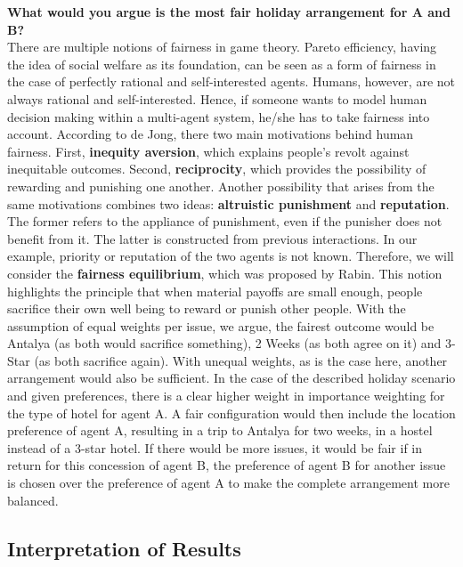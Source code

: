 \documentclass[a4paper,11pt]{article}
\theoremstyle{mytheor}
\begin{document}
\textbf{What would you argue is the most fair holiday arrangement for A and B?}\\
 There are multiple notions of fairness in game theory. Pareto efficiency, having the idea of social welfare as its foundation, can be seen as a form of fairness in the case of perfectly rational and self-interested agents. Humans, however, are not always rational and self-interested. Hence, if someone wants to model human decision making within a multi-agent system, he/she has to take fairness into account.\cite{Jong_Tuyls_Verbeeck_Roos}
According to de Jong, there two main motivations behind human fairness. First, \textbf{inequity aversion}, which explains people's revolt against inequitable outcomes. Second, \textbf{reciprocity}, which provides the possibility of rewarding and punishing one another. %
Another possibility that arises from the same motivations combines two ideas: \textbf{altruistic punishment} and \textbf{reputation}. The former refers to the appliance of punishment, even if the punisher does not benefit from it. The latter is constructed from previous interactions.\cite{Jong_Tuyls_Verbeeck_2008}
In our example, priority or reputation of the two agents is not known. Therefore, we will consider the \textbf{fairness equilibrium}, which was proposed by Rabin.\cite{Rabin_1993} This notion highlights the principle that when material payoffs are small enough, people sacrifice their own well being to reward or punish other people. With the assumption of equal weights per issue, we argue, the fairest outcome would be Antalya (as both would sacrifice something), 2 Weeks (as both agree on it) and 3-Star (as both sacrifice again). With unequal weights, as is the case here, another arrangement would also be sufficient. In the case of the described holiday scenario and given preferences, there is a clear higher weight in importance weighting for the type of hotel for agent A. A fair configuration would then include the location preference of agent A, resulting in a trip to Antalya for two weeks, in a hostel instead of a 3-star hotel. If there would be more issues, it would be fair if in return for this concession of agent B, the preference of agent B for another issue is chosen over the preference of agent A to make the complete arrangement more balanced.


\subsection{Interpretation of Results}
\end{document}
